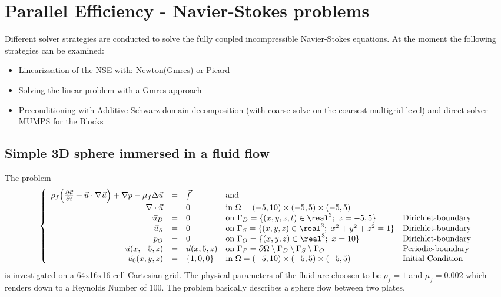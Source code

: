 \section{Parallel Efficiency - Navier-Stokes problems}
Different solver strategies are conducted to solve the fully coupled incompressible Navier-Stokes equations. At the moment the following strategies can be examined:
\begin{itemize}
	\item Linearizsation of the NSE with: Newton(Gmres) or Picard
	\item Solving the linear problem with a Gmres approach
	\item Preconditioning with Additive-Schwarz domain decomposition (with coarse solve on the coarsest multigrid level) and direct solver MUMPS for the Blocks
\end{itemize}
\subsection{Simple 3D sphere immersed in a fluid flow}
\label{sec:MPIPerformanceSphere}
The problem
\begin{equation}
\left\{ \begin{array} {rclll}
\rho_f\Big(\frac{\partial \vec{u}}{\partial t}+ \vec{u} \cdot \nabla \vec{u}\Big) +\nabla p - \mu_f \Delta \vec{u} & = & \vec{f}                   
& \text{and}\   &  \\
\nabla \cdot \vec{u} & = & 0                             
& \text{in}\ \Omega = (-5,10) \times (-5,5) \times (-5,5)  & \\
 \vec{u}_D & = & 0                             
& \text{on}\ \Gamma_D = \{ (x,y,z,t) \in \real^3; \ z = -5,5 \} 
& \text{Dirichlet-boundary}\\
 \vec{u}_S & = & 0                             
 & \text{on}\ \Gamma_S = \{ (x,y,z) \in \real^3; \ x^2+y^2+z^2 = 1 \}
& \text{Dirichlet-boundary} \\
 p_O & = & 0                             
& \text{on}\ \Gamma_O = \{ (x,y,z) \in \real^3; \ x = 10 \}
& \text{Dirichlet-boundary} \\
\vec{u}(x,-5,z) & = & \vec{u}(x,5,z)  
& \text{on}\ \Gamma_P = \partial \Omega \setminus \Gamma_D \setminus \Gamma_S \setminus \Gamma_O
& \text{Periodic-boundary}\\
\vec{u}_0(x,y,z) & = & \{1,0,0\}  
& \text{in}\ \Omega = (-5,10) \times (-5,5) \times (-5,5)   
& \text{Initial Condition}
\end{array} \right.
\label{eq:NavierStokesSphereBenchmark}
\end{equation}
is investigated on a 64x16x16 cell Cartesian grid. The physical parameters of the fluid are 
choosen to be $\rho_f=1$ and $\mu_f=0.002$ which renders down to a Reynolds Number of 100. 
The problem basically describes a sphere flow between two plates.

